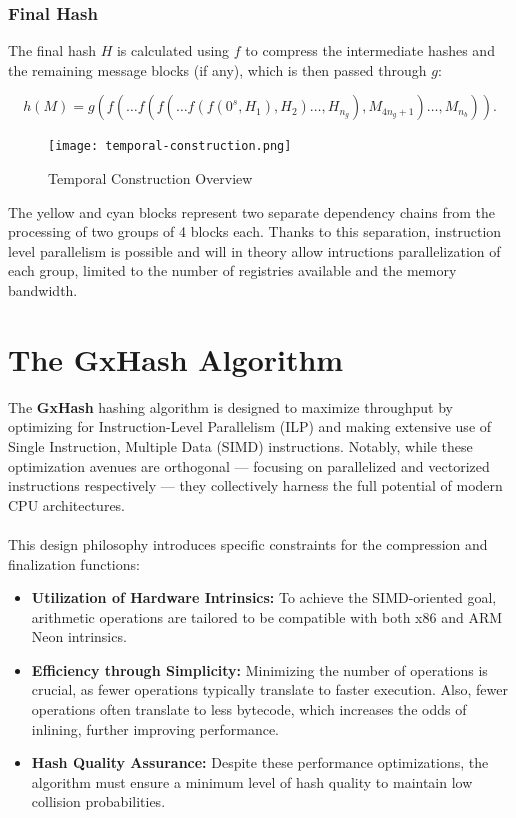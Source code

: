 \documentclass[10pt]{article}
\begin{document}
\subsubsection{Final Hash}

The final hash \( H \) is calculated using \( f \) to compress the intermediate hashes and the remaining message blocks (if any),
which is then passed through \( g \):

\begin{equation*}
h(M) = g\left( f( \ldots f(f(\ldots f(f(0^s, H_1), H_2) \ldots, H_{n_g}), M_{4{n_g}+1}) \ldots, M_{n_b} ) \right).
\end{equation*}

\begin{figure}[H]
\centering
\texttt{[image: temporal-construction.png]}
\caption{Temporal Construction Overview}
\label{fig:linear-construction}
\end{figure}

The yellow and cyan blocks represent two separate dependency chains from the processing of two groups of 4 blocks each. Thanks to this separation, instruction level parallelism is possible and will in theory allow intructions parallelization of each group, limited to the number of registries available and the memory bandwidth.

\clearpage
\section{The GxHash Algorithm}

The \textbf{GxHash} hashing algorithm is designed to maximize throughput by optimizing for Instruction-Level Parallelism (ILP) and making extensive use of Single Instruction, Multiple Data (SIMD) instructions. Notably, while these optimization avenues are orthogonal — focusing on parallelized and vectorized instructions respectively — they collectively harness the full potential of modern CPU architectures.\\\\
This design philosophy introduces specific constraints for the compression and finalization functions:

\begin{itemize}
    \item \textbf{Utilization of Hardware Intrinsics:} To achieve the SIMD-oriented goal, arithmetic operations are tailored to be compatible with both x86 and ARM Neon intrinsics.
    \item \textbf{Efficiency through Simplicity:} Minimizing the number of operations is crucial, as fewer operations typically translate to faster execution. Also, fewer operations often translate to less bytecode, which increases the odds of inlining, further improving performance.
    \item \textbf{Hash Quality Assurance:} Despite these performance optimizations, the algorithm must ensure a minimum level of hash quality to maintain low collision probabilities.
\end{itemize}
\end{document}
